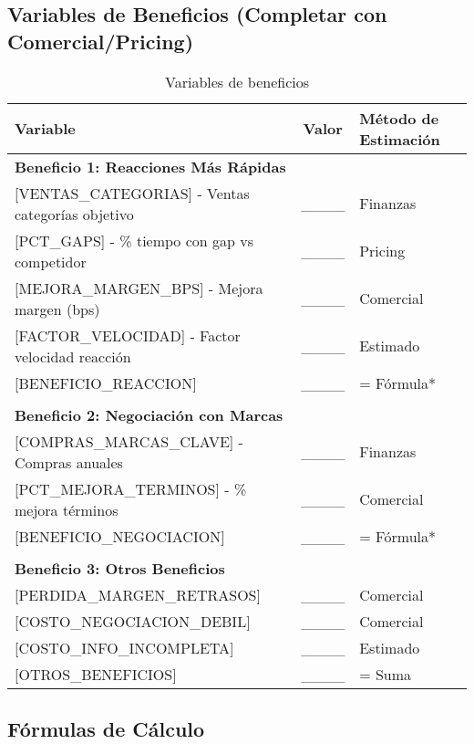\documentclass[12pt,a4paper]{article}
\begin{document}
\subsection{Variables de Beneficios (Completar con Comercial/Pricing)}

\begin{table}[h]
\centering
\small
\begin{tabularx}{\textwidth}{|X|c|X|}
\hline
\rowcolor{lightgray}
\textbf{Variable} & \textbf{Valor} & \textbf{Método de Estimación} \\
\hline
\multicolumn{3}{|l|}{\textbf{Beneficio 1: Reacciones Más Rápidas}} \\
\hline
{[}VENTAS\_CATEGORIAS{]} - Ventas categorías objetivo & \_\_\_\_ & Finanzas \\
\hline
{[}PCT\_GAPS{]} - \% tiempo con gap vs competidor & \_\_\_\_ & Pricing \\
\hline
{[}MEJORA\_MARGEN\_BPS{]} - Mejora margen (bps) & \_\_\_\_ & Comercial \\
\hline
{[}FACTOR\_VELOCIDAD{]} - Factor velocidad reacción & \_\_\_\_ & Estimado \\
\hline
{[}BENEFICIO\_REACCION{]} & \_\_\_\_ & = Fórmula* \\
\hline
\multicolumn{3}{|c|}{} \\
\hline
\multicolumn{3}{|l|}{\textbf{Beneficio 2: Negociación con Marcas}} \\
\hline
{[}COMPRAS\_MARCAS\_CLAVE{]} - Compras anuales & \_\_\_\_ & Finanzas \\
\hline
{[}PCT\_MEJORA\_TERMINOS{]} - \% mejora términos & \_\_\_\_ & Comercial \\
\hline
{[}BENEFICIO\_NEGOCIACION{]} & \_\_\_\_ & = Fórmula* \\
\hline
\multicolumn{3}{|c|}{} \\
\hline
\multicolumn{3}{|l|}{\textbf{Beneficio 3: Otros Beneficios}} \\
\hline
{[}PERDIDA\_MARGEN\_RETRASOS{]} & \_\_\_\_ & Comercial \\
\hline
{[}COSTO\_NEGOCIACION\_DEBIL{]} & \_\_\_\_ & Comercial \\
\hline
{[}COSTO\_INFO\_INCOMPLETA{]} & \_\_\_\_ & Estimado \\
\hline
{[}OTROS\_BENEFICIOS{]} & \_\_\_\_ & = Suma \\
\hline
\end{tabularx}
\caption{Variables de beneficios}
\end{table}

\subsection{Fórmulas de Cálculo}
\end{document}
